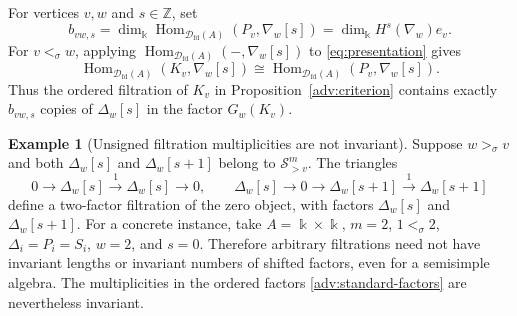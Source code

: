 \documentclass[11pt,a4paper]{article}
\newcommand{\D}{\mathcal D}
\newcommand{\ZZ}{\mathbb{Z}}
\newcommand{\std}{\Delta}
\newcommand{\costd}{\nabla}
\DeclareMathOperator{\fd}{fd}
\DeclareMathOperator{\Hom}{Hom}
\theoremstyle{plain}
\theoremstyle{definition}
\newtheorem{example}[theorem]{Example}
\numberwithin{equation}{section}
\begin{document}
For vertices $v,w$ and $s\in\ZZ$, set
\begin{equation}\label{adv:multiplicities}
 b_{vw,s}=\dim_{\Bbbk}\Hom_{\D_{\fd}(A)}(P_v,\costd_w[s])
         =\dim_{\Bbbk}H^s(\costd_w)e_v.
\end{equation}
For $v<_\sigma w$, applying
$\Hom_{\D_{\fd}(A)}(-,\costd_w[s])$ to
\eqref{eq:presentation} gives
\begin{equation}\label{adv:kernel-pairing}
 \Hom_{\D_{\fd}(A)}(K_v,\costd_w[s])
 \cong\Hom_{\D_{\fd}(A)}(P_v,\costd_w[s]).
\end{equation}
Thus the ordered filtration of $K_v$ in
Proposition~\ref{adv:criterion} contains exactly $b_{vw,s}$ copies of
$\std_w[s]$ in the factor $G_w(K_v)$.

\begin{example}[Unsigned filtration multiplicities are not invariant]
\label{adv:zero-filtration}
Suppose $w>_\sigma v$ and both $\std_w[s]$ and $\std_w[s+1]$ belong
to $\mathcal S_{>v}^m$. The triangles
\begin{equation}\label{adv:cancellation}
 0\longrightarrow\std_w[s]\xrightarrow{1}\std_w[s]\longrightarrow0,
 \qquad
 \std_w[s]\longrightarrow0\longrightarrow\std_w[s+1]
 \xrightarrow{1}\std_w[s+1]
\end{equation}
define a two-factor filtration of the zero object, with factors
$\std_w[s]$ and $\std_w[s+1]$.
For a concrete instance, take $A=\Bbbk\times\Bbbk$, $m=2$,
$1<_\sigma2$, $\std_i=P_i=S_i$, $w=2$, and $s=0$.
Therefore arbitrary filtrations need not have invariant lengths or
invariant numbers of shifted factors, even for a semisimple algebra.
The multiplicities in the ordered factors \eqref{adv:standard-factors}
are nevertheless invariant.
\end{example}
\end{document}
